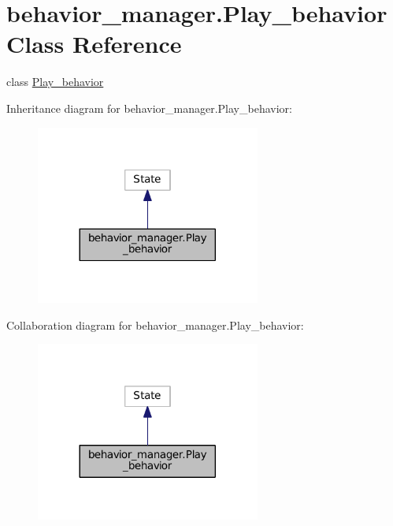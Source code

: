 \hypertarget{classbehavior__manager_1_1Play__behavior}{}\section{behavior\+\_\+manager.\+Play\+\_\+behavior Class Reference}
\label{classbehavior__manager_1_1Play__behavior}


class \hyperlink{classbehavior__manager_1_1Play__behavior}{Play\+\_\+behavior}  




Inheritance diagram for behavior\+\_\+manager.\+Play\+\_\+behavior\+:\nopagebreak
\begin{figure}[H]
\begin{center}
\leavevmode
\includegraphics[width=209pt]{classbehavior__manager_1_1Play__behavior__inherit__graph}
\end{center}
\end{figure}


Collaboration diagram for behavior\+\_\+manager.\+Play\+\_\+behavior\+:\nopagebreak
\begin{figure}[H]
\begin{center}
\leavevmode
\includegraphics[width=209pt]{classbehavior__manager_1_1Play__behavior__coll__graph}
\end{center}
\end{figure}
